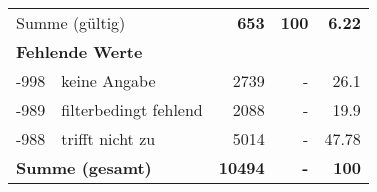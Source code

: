 \begin{longtable}{lXrrr}
     \midrule
     \multicolumn{2}{l}{Summe (gültig)} &
       \textbf{\num{653}} &
     \textbf{100} &
       \textbf{\num[round-mode=places,round-precision=2]{6,22}} \\
     \multicolumn{5}{l}{\textbf{Fehlende Werte}}\\
       -998 &
       keine Angabe &
         \num{2739} &
        - &
         \num[round-mode=places,round-precision=2]{26,1} \\
       -989 &
       filterbedingt fehlend &
         \num{2088} &
        - &
         \num[round-mode=places,round-precision=2]{19,9} \\
       -988 &
       trifft nicht zu &
         \num{5014} &
        - &
         \num[round-mode=places,round-precision=2]{47,78} \\
     \midrule
     \multicolumn{2}{l}{\textbf{Summe (gesamt)}} &
          \textbf{\num{10494}} &
        \textbf{-} &
        \textbf{100} \\
     \bottomrule
     \end{longtable}
     

